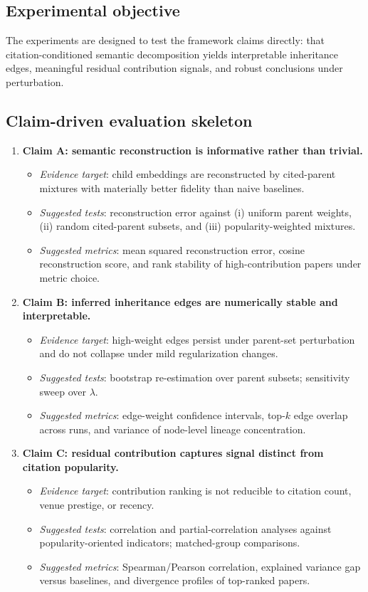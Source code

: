 \subsection{Experimental objective}
The experiments are designed to test the framework claims directly: that citation-conditioned semantic decomposition yields interpretable inheritance edges, meaningful residual contribution signals, and robust conclusions under perturbation.

\subsection{Claim-driven evaluation skeleton}
\begin{enumerate}
    \item \textbf{Claim A: semantic reconstruction is informative rather than trivial.}
    \begin{itemize}
        \item \emph{Evidence target}: child embeddings are reconstructed by cited-parent mixtures with materially better fidelity than naive baselines.
        \item \emph{Suggested tests}: reconstruction error against (i) uniform parent weights, (ii) random cited-parent subsets, and (iii) popularity-weighted mixtures.
        \item \emph{Suggested metrics}: mean squared reconstruction error, cosine reconstruction score, and rank stability of high-contribution papers under metric choice.
    \end{itemize}

    \item \textbf{Claim B: inferred inheritance edges are numerically stable and interpretable.}
    \begin{itemize}
        \item \emph{Evidence target}: high-weight edges persist under parent-set perturbation and do not collapse under mild regularization changes.
        \item \emph{Suggested tests}: bootstrap re-estimation over parent subsets; sensitivity sweep over $\lambda$.
        \item \emph{Suggested metrics}: edge-weight confidence intervals, top-$k$ edge overlap across runs, and variance of node-level lineage concentration.
    \end{itemize}

    \item \textbf{Claim C: residual contribution captures signal distinct from citation popularity.}
    \begin{itemize}
        \item \emph{Evidence target}: contribution ranking is not reducible to citation count, venue prestige, or recency.
        \item \emph{Suggested tests}: correlation and partial-correlation analyses against popularity-oriented indicators; matched-group comparisons.
        \item \emph{Suggested metrics}: Spearman/Pearson correlation, explained variance gap versus baselines, and divergence profiles of top-ranked papers.
    \end{itemize}


\end{enumerate}
